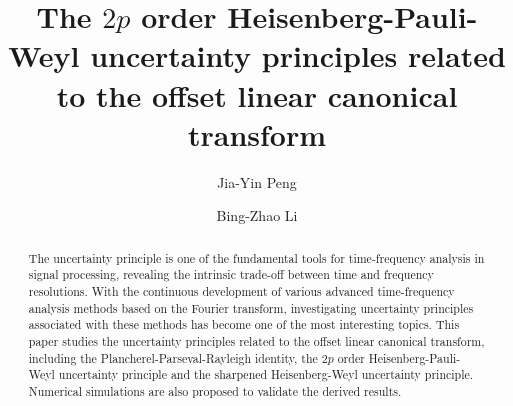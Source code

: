 \documentclass[preprint,12pt]{elsarticle}
\begin{document}
\begin{frontmatter}



\title{The $2p$ order Heisenberg-Pauli-Weyl uncertainty principles related to the offset linear canonical transform} %

\author[a,b]{Jia-Yin Peng} %
\author[a,b]{Bing-Zhao Li}





\begin{abstract}
The uncertainty principle is one of the fundamental tools for time-frequency analysis in signal processing, revealing the intrinsic trade-off between time and frequency resolutions. With the continuous development of various advanced time-frequency analysis methods based on the Fourier transform, investigating uncertainty principles associated with these methods has become one of the most interesting topics. This paper studies the uncertainty principles related to the offset linear canonical transform, including the Plancherel-Parseval-Rayleigh identity, the $2p$ order Heisenberg-Pauli-Weyl uncertainty principle and the sharpened Heisenberg-Weyl uncertainty principle. Numerical simulations are also proposed to validate the derived results.
\end{abstract}


\end{frontmatter}
\end{document}
